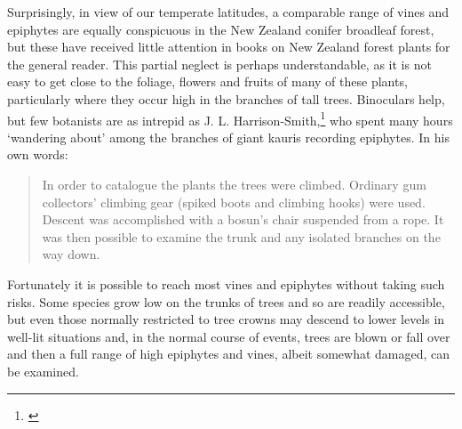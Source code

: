 Surprisingly, in view of our temperate latitudes, a comparable range of vines and epiphytes are equally conspicuous in the New Zealand conifer broadleaf forest, but these have received little attention in books on New Zealand forest plants for the general reader.
This partial neglect is perhaps understandable, as it is not easy to get close to the foliage, flowers and fruits of many of these plants, particularly where they occur high in the branches of tall trees.
Binoculars help, but few botanists are as intrepid as J. L. Harrison-Smith,\footnote{\cite{harrisonsmith1938kauri}} who spent many hours `wandering about' among the branches of giant kauris recording epiphytes.
In his own words:

\begin{quote}
	In order to catalogue the plants the trees were climbed.
	Ordinary gum collectors' climbing gear (spiked boots and climbing hooks) were used.
	Descent was accomplished with a bosun's chair suspended from a rope.
	It was then possible to examine the trunk and any isolated branches on the way down.
\end{quote}

Fortunately it is possible to reach most vines and epiphytes without taking such risks.
Some species grow low on the trunks of trees and so are readily accessible, but even those normally restricted to tree crowns may descend to lower levels in well-lit situations and, in the normal course of events, trees are blown or fall over and then a full range of high epiphytes and vines, albeit somewhat damaged, can be examined.

